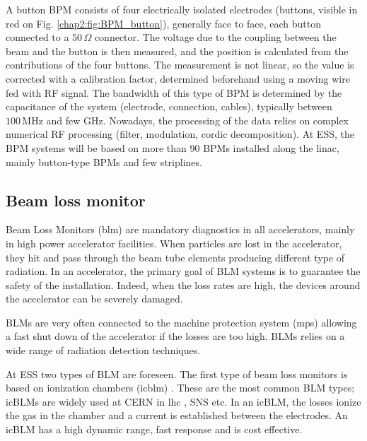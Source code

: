\begin{refsection}
  
  A button BPM consists of four electrically isolated electrodes (buttons, visible in red on Fig. \ref{chap2:fig:BPM_button}), generally face to face, each button connected to a $50\,\Omega$ connector. The voltage due to the coupling between the beam and the button is then measured, and the position is calculated from the contributions of the four buttons. The measurement is not linear, so the value is corrected with a calibration factor, determined beforehand using a moving wire fed with RF signal. The bandwidth of this type of BPM is determined by the capacitance of the system (electrode, connection, cables), typically between $100\,\mathrm{MHz}$ and few GHz. Nowadays, the processing of the data relies on complex numerical RF processing (filter, modulation, cordic decomposition). At ESS, the BPM systems will be based on more than 90 BPMs installed along the linac, mainly button-type BPMs and few striplines.

  \subsection{Beam loss monitor}
  Beam Loss Monitors (\acrshort{blm}) are mandatory diagnostics in all accelerators, mainly in high power accelerator facilities. When particles are lost in the accelerator, they hit and pass through the beam tube elements producing different type of radiation. In an accelerator, the primary goal of BLM systems is to guarantee the safety of the installation. Indeed, when the loss rates are high, the devices around the accelerator can be severely damaged.

  BLMs are very often connected to the machine protection system (\acrshort{mps}) allowing a fast shut down of the accelerator if the losses are too high. BLMs relies on a wide range of radiation detection techniques.

  At ESS two types of BLM are foreseen. The first type of beam loss monitors is based on ionization chambers (\acrshort{icblm}) \cite{Grishin:IBIC2017-WEPWC03}. These are the most common BLM types; icBLMs are widely used at CERN in \acrshort{lhc} \cite{HOLZER20122055}, SNS etc. In an icBLM, the losses ionize the gas in the chamber and a current is established between the electrodes. An icBLM has a high dynamic range, fast response and is cost effective.

  


\end{refsection}
